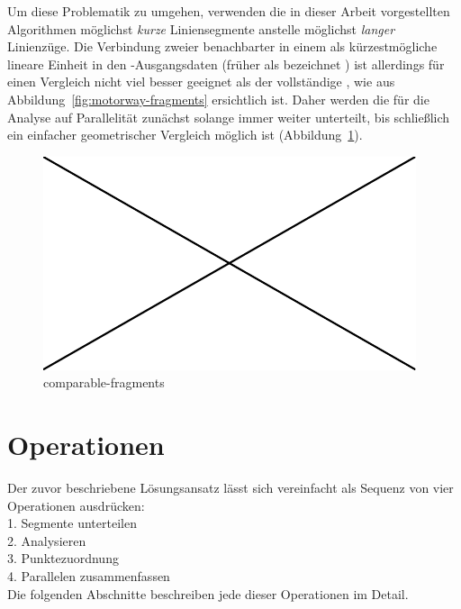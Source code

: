 \documentclass[../main/thesis.tex]{subfiles}
\begin{document}
Um diese Problematik zu umgehen, verwenden die in dieser Arbeit vorgestellten Algorithmen möglichst \emph{kurze} Liniensegmente anstelle möglichst \emph{langer} Linienzüge.
Die Verbindung zweier benachbarter  in einem  als kürzestmögliche lineare Einheit in den \osm-Ausgangsdaten (früher als  bezeichnet ) ist allerdings für einen Vergleich nicht viel besser geeignet als der vollständige %
, wie aus Abbildung~\ref{fig:motorway-fragments} ersichtlich ist.
Daher werden die  für die Analyse auf Parallelität zunächst solange immer weiter unterteilt, bis schließlich ein einfacher geometrischer Vergleich möglich ist (Abbildung~\ref{fig:comparable-fragments}).

\begin{figure}[ht]
    \centering
    \includegraphics[width=\ScaleIfNeeded]{../image-missing}
    \caption{comparable-fragments}\label{fig:comparable-fragments}
\end{figure}



\section{Operationen}

Der zuvor beschriebene Lösungsansatz lässt sich vereinfacht als Sequenz von vier Operationen ausdrücken:\\
1. Segmente unterteilen\\
2. Analysieren\\
3. Punktezuordnung\\
4. Parallelen zusammenfassen\\


Die folgenden Abschnitte beschreiben jede dieser Operationen im Detail.
\end{document}
